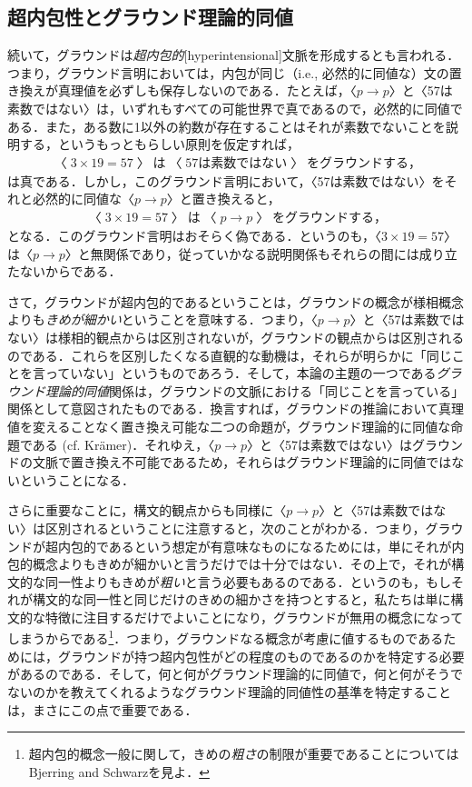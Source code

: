\documentclass[twoside,14Q,uplatex,dvipdfmx]{jsarticle}
\theoremstyle{definition}
\begin{document}
\subsection{超内包性とグラウンド理論的同値}\label{hyperintensional}
続いて，グラウンドは\emph{超内包的}[hyperintensional]文脈を形成するとも言われる．つまり，グラウンド言明においては，内包が同じ（i.e., 必然的に同値な）文の置き換えが真理値を必ずしも保存しないのである．たとえば，〈$p\rightarrow p$〉と〈57は素数ではない〉は，いずれもすべての可能世界で真であるので，必然的に同値である．また，ある数に1以外の約数が存在することはそれが素数でないことを説明する，というもっともらしい原則を仮定すれば，
	\begin{align*}
	〈3\times 19=57〉は〈57は素数ではない〉をグラウンドする，
	\end{align*}
は真である．しかし，このグラウンド言明において，〈57は素数ではない〉をそれと必然的に同値な〈$p\rightarrow p$〉と置き換えると，
	\begin{align*}
	〈3\times 19=57〉は〈p\rightarrow p〉をグラウンドする，
	\end{align*}
となる．このグラウンド言明はおそらく偽である．というのも，〈$3\times 19=57$〉は〈$p\rightarrow p$〉と無関係であり，従っていかなる説明関係もそれらの間には成り立たないからである．

さて，グラウンドが超内包的であるということは，グラウンドの概念が様相概念よりも\emph{きめが細かい}ということを意味する．つまり，〈$p\rightarrow p$〉と〈57は素数ではない〉は様相的観点からは区別されないが，グラウンドの観点からは区別されるのである．これらを区別したくなる直観的な動機は，それらが明らかに「同じことを言っていない」というものであろう．そして，本論の主題の一つである\emph{グラウンド理論的同値}関係は，グラウンドの文脈における「同じことを言っている」関係として意図されたものである．換言すれば，グラウンドの推論において真理値を変えることなく置き換え可能な二つの命題が，グラウンド理論的に同値な命題である (cf. Kr\"{a}mer\cite{Kramer2018,Kramer2021})．それゆえ，〈$p\rightarrow p$〉と〈57は素数ではない〉はグラウンドの文脈で置き換え不可能であるため，それらはグラウンド理論的に同値ではないということになる．

さらに重要なことに，構文的観点からも同様に〈$p\rightarrow p$〉と〈57は素数ではない〉は区別されるということに注意すると，次のことがわかる．つまり，グラウンドが超内包的であるという想定が有意味なものになるためには，単にそれが内包的概念よりもきめが細かいと言うだけでは十分ではない．その上で，それが構文的な同一性よりもきめが\emph{粗い}と言う必要もあるのである．というのも，もしそれが構文的な同一性と同じだけのきめの細かさを持つとすると，私たちは単に構文的な特徴に注目するだけでよいことになり，グラウンドが無用の概念になってしまうからである\footnote{超内包的概念一般に関して，きめの\emph{粗さ}の制限が重要であることについてはBjerring and Schwarz\cite{BjerringandSchwarz2017}を見よ．}．つまり，グラウンドなる概念が考慮に値するものであるためには，グラウンドが持つ超内包性がどの程度のものであるのかを特定する必要があるのである．そして，何と何がグラウンド理論的に同値で，何と何がそうでないのかを教えてくれるようなグラウンド理論的同値性の基準を特定することは，まさにこの点で重要である．
%
%
%
\end{document}
